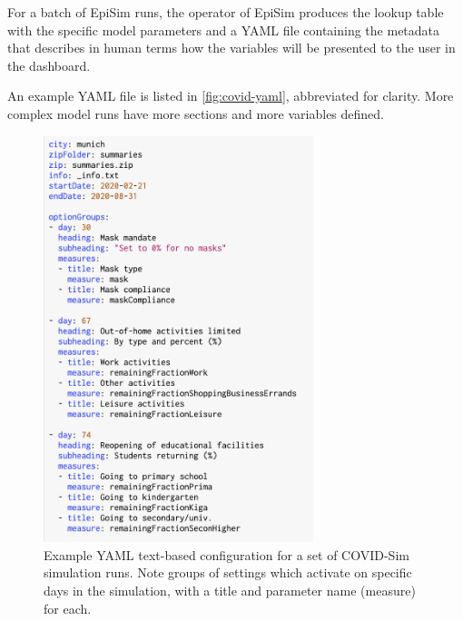 For a batch of EpiSim runs, the operator of EpiSim produces the lookup table with the specific model parameters and a YAML file containing the metadata that describes in human terms how the variables will be presented to the user in the dashboard.

An example YAML file is listed in \autoref{fig:covid-yaml}, abbreviated for clarity. More complex model runs have more sections and more variables defined.

\begin{figure}
  \centering
	\begin{minipage}{0.9\textwidth}
    \centering
    \includegraphics[width=0.7\textwidth]{chapters/21-covid-sim/images/covid-yaml.png}
  \caption{Example YAML text-based configuration for a set of COVID-Sim simulation runs. Note groups of settings which activate on specific days in the simulation, with a title and parameter name (measure) for each.}
  \label{fig:covid-yaml}
	\end{minipage}
\end{figure}

